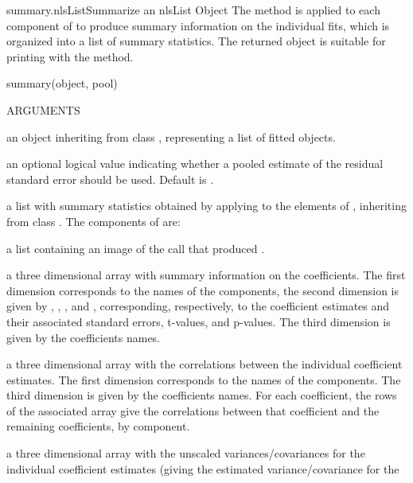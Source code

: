 \documentclass[pdftex]{article} \usepackage{url,graphicx}
\begin{document}
\begin{Helpfile}{summary.nlsList}{Summarize an nlsList Object}
The  method is applied to each  component of
 to produce summary information on the individual fits,
which is organized into a list of summary statistics. The returned
object is suitable for printing with the 
method.
\begin{Example}
summary(object, pool)
\end{Example}
\begin{Argument}{ARGUMENTS}
\item[\Co{object:}]
an object inheriting from class ,
representing a list of  fitted objects.
\item[\Co{pool:}]
an optional logical value indicating whether a pooled
estimate of the residual standard error should be used. Default is
.
\end{Argument}
a list with summary statistics obtained by applying 
to the elements of , inheriting from class
. The components of  are:
\begin{Argument}{}
\vspace{-16pt} 
\item[\Co{call:}]
a list containing an image of the  call that
produced .
\item[\Co{parameters:}]
a three dimensional array with summary information
on the  coefficients. The first dimension corresponds to
the names of the  components, the second dimension is
given by   , , ,
and , corresponding, respectively, to the
coefficient estimates and their associated standard errors,
t-values, and p-values. The third dimension is given by the
coefficients names.
\item[\Co{correlation:}]
a three dimensional array with the 
correlations between the individual  coefficient
estimates. The first dimension corresponds to the names of the
 components. The third dimension is given by the
coefficients names. For each coefficient, the rows of the associated
array give the correlations between that coefficient and the
remaining coefficients, by  component.
\item[\Co{cov.unscaled:}]
a three dimensional array with the unscaled
variances/covariances for the individual  coefficient
estimates (giving the estimated variance/covariance for the

\end{Argument}
\end{Helpfile}
\end{document}
